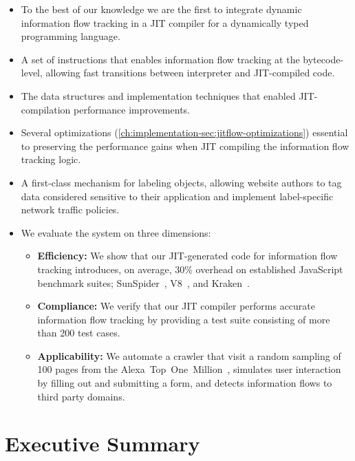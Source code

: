 \begin{itemize}

\item{To the best of our knowledge we are the first to integrate dynamic information flow tracking in a JIT compiler for a dynamically typed programming language.}

\item{A set of instructions that enables information flow tracking at the bytecode-level, allowing fast transitions between interpreter and JIT-compiled code.}

\item{The data structures and implementation techniques that enabled JIT-compilation performance improvements.}

\item Several optimizations (\autoref{ch:implementation-sec:jitflow-optimizations}) essential to preserving the performance gains when JIT compiling the information flow tracking logic.

\item{A first-class mechanism for labeling objects, allowing website authors to tag data considered sensitive to their application and implement label-specific network traffic policies.}

\item{We evaluate the system on three dimensions:}

\begin{itemize}
\item{\textbf{Efficiency:}
We show that our JIT-generated code for information flow tracking introduces, on average, 30\% overhead on established JavaScript benchmark suites;  SunSpider~\cite{sunspider}, V8~\cite{v8}, and Kraken~\cite{kraken}.
}

\item{\textbf{Compliance:}
We verify that our JIT compiler performs accurate information flow tracking by providing a test suite consisting of more than 200 test cases.
}

\item{\textbf{Applicability:}
We automate a crawler that visit a random sampling of 100 pages from the Alexa~Top~One~Million~\cite{alexa}, simulates user interaction by filling out and submitting a form, and detects information flows to third party domains.
}
\end{itemize}

\end{itemize}

\section{Executive Summary}

